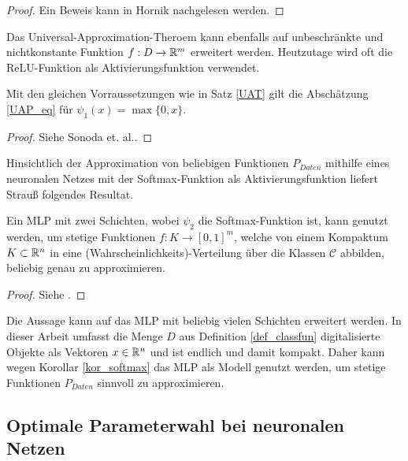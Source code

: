 \begin{proof}
    Ein Beweis kann in Hornik\cite{hornik1991approximation} nachgelesen werden.
\end{proof}

Das Universal-Approximation-Theroem kann ebenfalls auf unbeschränkte und nichtkonstante Funktion $f:D \rightarrow \mathbb{R}^m$ erweitert werden. Heutzutage wird oft die ReLU-Funktion als Aktivierungsfunktion verwendet\cite{schmidt2020nonparametric,li2017convergence}.

\begin{kor}
    Mit den gleichen Vorraussetzungen wie in Satz \ref{UAT} gilt die Abschätzung \ref{UAP_eq} für $\psi_1(x)=\max\{0,x\}$.
\end{kor}

\begin{proof}
    Siehe Sonoda et. al.\cite{sonoda2017neural}.
\end{proof}

Hinsichtlich der Approximation von beliebigen Funktionen $P_{Daten}$ mithilfe eines neuronalen Netzes mit der Softmax-Funktion als Aktivierungsfunktion liefert Strauß\cite{strauss} folgendes Resultat.

\begin{kor}
    \label{kor_softmax}
    Ein MLP mit zwei Schichten, wobei $\psi_2$ die Softmax-Funktion ist, kann genutzt werden, um stetige Funktionen $f:K \rightarrow [0,1]^m$, welche von einem Kompaktum $K \subset \mathbb{R}^n$ in eine (Wahrscheinlichkeits)-Verteilung über die Klassen $\mathcal{C}$ abbilden, beliebig genau zu approximieren.
\end{kor}

\begin{proof}
    Siehe \cite{strauss}.
\end{proof}

Die Aussage kann auf das MLP mit beliebig vielen Schichten erweitert werden.
In dieser Arbeit umfasst die Menge $D$ aus Definition \ref{def_classfun} digitalisierte Objekte als Vektoren $x \in \mathbb{R}^n$ und ist endlich und damit kompakt. Daher kann wegen Korollar \ref{kor_softmax} das MLP als Modell genutzt werden, um stetige Funktionen $P_{Daten}$ sinnvoll zu approximieren.

\subsection{Optimale Parameterwahl bei neuronalen Netzen}


